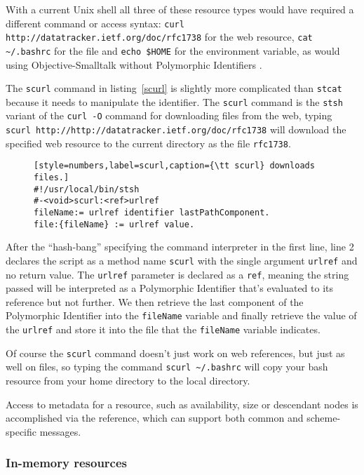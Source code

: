 \documentclass[preprint,authoryear]{llncs}
\begin{document}
With a current Unix shell all three of these resource types would have required a different
command or access syntax:   {\tt curl http://datatracker.ietf.org/doc/rfc1738} for the
web resource, {\tt cat  \~\//.bashrc} for the file and {\tt echo \$HOME} for the environment
variable, as would using Objective-Smalltalk without Polymorphic Identifiers .

The {\tt scurl} command in listing~\ref{scurl} is slightly more complicated than {\tt stcat} because
it needs to manipulate the identifier.  The {\tt scurl} command
is the {\tt stsh} variant of the {\tt curl -O} command for downloading files from the web, typing
{\tt scurl http://http://datatracker.ietf.org/doc/rfc1738} will download the specified web resource
to the current directory as the file {\tt rfc1738}.

\begin{figure}[htbp]
\begin{lstlisting}[style=numbers,label=scurl,caption={\tt scurl} downloads files.]
#!/usr/local/bin/stsh
#-<void>scurl:<ref>urlref
fileName:= urlref identifier lastPathComponent.
file:{fileName} := urlref value.
\end{lstlisting}
\end{figure}

After the ``hash-bang'' specifying the command interpreter in the first line, line 2 declares
the script as a method name {\tt scurl} with the single argument {\tt urlref} and no return
value.  The {\tt urlref} parameter is declared as a {\tt ref}, meaning the string passed will
be interpreted as a Polymorphic Identifier that's evaluated to its reference but not further.
We then retrieve the last component of the Polymorphic Identifier into the {\tt fileName}
variable and finally retrieve the value of the {\tt urlref} and store it into the file that
the {\tt fileName} variable indicates.

Of course the {\tt scurl} command doesn't just work on web references, but just as well
on files, so typing the command {\tt scurl \~\//.bashrc} will copy your bash resource from your home directory
to the local directory.

Access to metadata for a resource, such as availability, size or descendant nodes
is accomplished via the reference, which can support both common and scheme-specific
messages.

\subsubsection{In-memory resources}
\label{inmemory}
\end{document}
